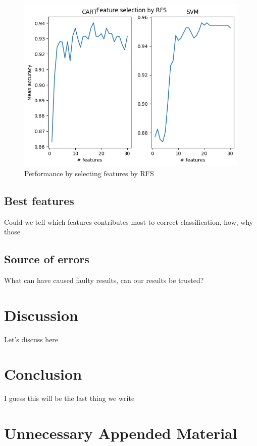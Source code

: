 \documentclass{kththesis}
\begin{document}
\begin{figure}[ht!]
  \includegraphics[width=\linewidth]{../plots/RFS.png}
  \caption{Performance by selecting features by RFS}
  \label{fig:rfs}
\end{figure}

\section{Best features}

Could we tell which features contributes most to correct classification, how, why those

\section{Source of errors}

What can have caused faulty results, can our results be trusted?

\chapter{Discussion}

Let's discuss here

\chapter{Conclusion}

I guess this will be the last thing we write

\printbibliography[heading=bibintoc] %

\appendix

\chapter{Unnecessary Appended Material}
\end{document}
